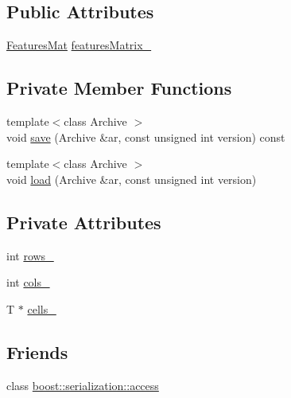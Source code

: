 \subsection*{Public Attributes}
\begin{DoxyCompactItemize}
\item 
\hyperlink{classrdf_1_1bpc_1_1FeaturesMat}{Features\+Mat} \hyperlink{classrdf_1_1bpc_1_1Matrix_a635849575c43df7969d5328cede7a040}{features\+Matrix\+\_\+}
\end{DoxyCompactItemize}
\subsection*{Private Member Functions}
\begin{DoxyCompactItemize}
\item 
{\footnotesize template$<$class Archive $>$ }\\void \hyperlink{classrdf_1_1bpc_1_1Matrix_a6c3808d393e218a29df6ff1bbdfbe8ea}{save} (Archive \&ar, const unsigned int version) const 
\item 
{\footnotesize template$<$class Archive $>$ }\\void \hyperlink{classrdf_1_1bpc_1_1Matrix_a87e3e793dc7e2fa499aaba37bf825510}{load} (Archive \&ar, const unsigned int version)
\end{DoxyCompactItemize}
\subsection*{Private Attributes}
\begin{DoxyCompactItemize}
\item 
int \hyperlink{classrdf_1_1bpc_1_1Matrix_a594473393d0fb508cf68714062f65256}{rows\+\_\+}
\item 
int \hyperlink{classrdf_1_1bpc_1_1Matrix_a2a15ca3ef49e2f0c7724e5c556878b3c}{cols\+\_\+}
\item 
T $\ast$ \hyperlink{classrdf_1_1bpc_1_1Matrix_adebf06eb7c44da98fd103edfb17988f1}{cells\+\_\+}
\end{DoxyCompactItemize}
\subsection*{Friends}
\begin{DoxyCompactItemize}
\item 
class \hyperlink{classrdf_1_1bpc_1_1Matrix_ac98d07dd8f7b70e16ccb9a01abf56b9c}{boost\+::serialization\+::access}
\end{DoxyCompactItemize}


